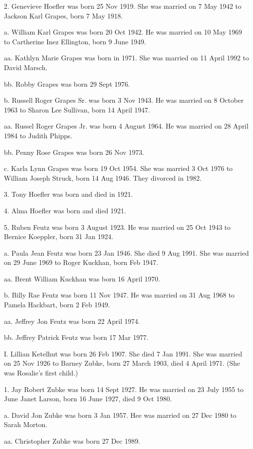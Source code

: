 \documentclass[a4paper]{article}
\begin{document}
2. Genevieve Hoefler was born 25 Nov 1919.  She was married on 7 May 1942  to Jackson Karl Grapes, born 7 May 1918.

a. William Karl Grapes was born 20 Oct 1942.  He was married on 10 May 1969 to Cartherine Inez Ellington, born 9 June 1949.

aa. Kathlyn Marie Grapes was born in 1971.  She was married on 11 April 1992 to David Marsch.

bb. Robby Grapes was born 29 Sept 1976.

b. Russell Roger Grapes Sr. was born 3 Nov 1943.  He was married on 8 October 1963 to Sharon Lee Sullivan, born 14 April 1947.

aa. Russel Roger Grapes Jr. was born 4 August 1964.  He was married on 28 April 1984 to Judith Phipps.

bb. Penny Rose Grapes was born 26 Nov 1973.

c. Karla Lynn Grapes was born 19 Oct 1954.  She was married 3 Oct 1976 to William Joseph Struck, born 14 Aug 1946.  They divorced in 1982.

3.  Tony Hoefler was born and died in 1921.

4. Alma Hoefler was born and died 1921.

5. Ruben Feutz was born 3 August 1923.  He was married on 25 Oct 1943 to Bernice Koeppler, born 31 Jan 1924.

a. Paula Jean Feutz was born 23 Jan 1946.  She died 9 Aug 1991.  She was married on 29 June 1969 to Roger Kuckhan, born Feb 1947.

aa. Brent William Kuckhan was born 16 April 1970.

b. Billy Rae Feutz  was born 11 Nov 1947.  He was married on 31 Aug 1968 to Pamela Hackbart, born 2 Feb 1949.

aa. Jeffrey Jon Feutz was born 22 April 1974.

bb. Jeffrey Patrick Feutz was born 17 Mar 1977.

I.  Lillian Ketelhut was born 26 Feb 1907.  She died 7 Jan 1991.  She was married on 25 Nov 1926 to Barney Zubke, born 27 March 1903, died 4 April 1971.  (She was Rosalie's first child.)

1. Jay Robert Zubke was born 14 Sept 1927.  He was married on 23 July 1955 to June Janet Larson, born 16 June 1927, died 9 Oct 1980.

a. David Jon Zubke was born 3 Jan 1957.  Hee was married on 27 Dec 1980 to Sarah Morton.

aa. Christopher Zubke was born 27 Dec 1989.
\end{document}
